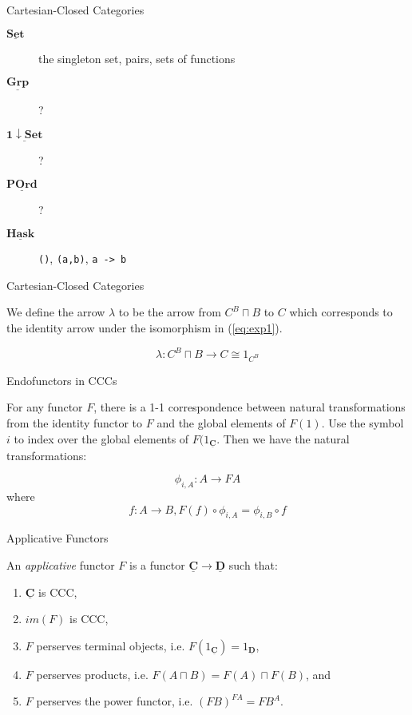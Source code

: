 \documentclass[10pt]{beamer}
\newcommand{\Cat}[1]{\ensuremath{\underline{\mathbf{#1}}}}
\newcommand{\Com}[3]{#3^{#2}}
\newcommand{\eqnref}[1]{(\ref{eq:#1})}
\theoremstyle{definition}
\theoremstyle{remark}
\numberwithin{equation}{section}
\begin{document}
\begin{frame}[fragile]{Cartesian-Closed Categories}

  \begin{description}
    \item[\Cat{Set}] the singleton set, pairs, sets of functions
    \item[\Cat{Grp}] ?
    \item[\Cat{1\downarrow Set}] ?
    \item[\Cat{POrd}] ?
    \item[\Cat{Hask}] \lstinline{()}, \lstinline{(a,b)}, \lstinline{a -> b}
  \end{description}

\end{frame}

\begin{frame}[fragile]{Cartesian-Closed Categories}

  We define the arrow $\lambda$ to be the arrow from $\Com{C}{B}{C}\sqcap B$ to $C$ which corresponds to the identity arrow under the isomorphism in \eqnref{exp1}.

  \[
  \lambda : \Com{C}{B}{C}\sqcap B \rightarrow C \cong 1_{\Com{C}{B}{C}}
  \]

\end{frame}

\begin{frame}[fragile]{Endofunctors in CCCs}

  For any functor $F$, there is a 1-1 correspondence between natural transformations from the identity functor to $F$ and the global elements of $F(1)$. Use the symbol $i$ to index over the global elements of $F(1_{\Cat{C}}$. Then we have the natural transformations:
  
  \[
  \phi_{i,A} : A \rightarrow F A
  \]
  where
  \[
  f : A \rightarrow B, F(f) \circ \phi_{i,A} = \phi_{i,B} \circ f
  \]

\end{frame}

\begin{frame}[fragile]{Applicative Functors}

  An \emph{applicative} functor $F$ is a functor $\Cat{C}\rightarrow \Cat{D}$ such that:
  \begin{enumerate}
    \item $\Cat{C}$ is CCC,
    \item $im(F)$ is CCC,
    \item $F$ perserves terminal objects, i.e. $F(1_{\Cat{C}})=1_{\Cat{D}}$,
    \item $F$ perserves products, i.e. $F(A\sqcap B)=F(A)\sqcap F(B)$, and
    \item $F$ perserves the power functor, i.e. $\Com{D}{F A}{(F B)} = F \Com{C}{A}{B}$.
  \end{enumerate}

\end{frame}
\end{document}
